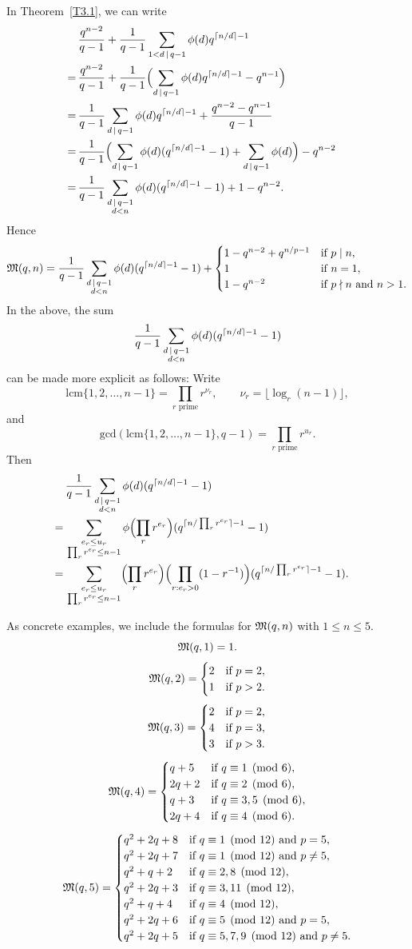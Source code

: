 \documentclass{amsart}
\numberwithin{equation}{section}
\theoremstyle{definition}
\begin{document}
In Theorem~\ref{T3.1}, we can write 
\begin{align*}
&\frac{q^{n-2}}{q-1}+\frac 1{q-1}\sum_{1<d\,\mid\, q-1}\phi(d)q^{\lceil n/d\rceil-1}\cr
=\,&\frac{q^{n-2}}{q-1}+\frac 1{q-1}\Bigl(\sum_{d\,\mid\, q-1}\phi(d)q^{\lceil n/d\rceil-1}-q^{n-1}\Bigr)\cr
=\,&\frac 1{q-1}\sum_{d\,\mid\, q-1}\phi(d)q^{\lceil n/d\rceil-1}+\frac{q^{n-2}-q^{n-1}}{q-1}\cr
=\,&\frac 1{q-1}\Bigl(\sum_{d\,\mid\, q-1}\phi(d)(q^{\lceil n/d\rceil-1}-1)+\sum_{d\,\mid\, q-1}\phi(d)\Bigr)-q^{n-2}\cr
=\,&\frac 1{q-1}\sum_{\substack{d\,\mid\, q-1\cr d<n}}\phi(d)(q^{\lceil n/d\rceil-1}-1)+1-q^{n-2}.
\end{align*}
Hence
\[
\frak M(q,n)=\frac 1{q-1}\sum_{\substack{d\,\mid\, q-1\cr d<n}}\phi(d)(q^{\lceil n/d\rceil-1}-1)+\begin{cases}
1-q^{n-2}+q^{n/p-1}&\text{if}\ p\mid n,\cr
1&\text{if}\ n=1,\cr
1-q^{n-2}&\text{if $p\nmid n$ and $n>1$}.
\end{cases}
\]
In the above, the sum
\[
\frac 1{q-1}\sum_{\substack{d\,\mid\, q-1\cr d<n}}\phi(d)(q^{\lceil n/d\rceil-1}-1)
\]
can be made more explicit as follows: Write
\[
\text{lcm}\{1,2,\dots,n-1\}=\prod_{\text{$r$ prime}}r^{\nu_r},\qquad \nu_r=\lfloor\log_r(n-1)\rfloor,
\]
and
\[
\text{gcd}(\text{lcm}\{1,2,\dots,n-1\},q-1)=\prod_{\text{$r$ prime}}r^{u_r}. 
\]
Then
\begin{align*}
&\frac 1{q-1}\sum_{\substack{d\,\mid\, q-1\cr d<n}}\phi(d)(q^{\lceil n/d\rceil-1}-1)\cr
=\,&\sum_{\substack{e_r\le u_r\cr \prod_r r^{e_r}\le n-1}}\phi\Bigl(\prod_r r^{e_r}\Bigr)(q^{\lceil n/\prod_r r^{e_r}\rceil-1}-1)\cr
=\,&\sum_{\substack{e_r\le u_r\cr \prod_r r^{e_r}\le n-1}}\Bigl(\prod_r r^{e_r}\Bigr)\Bigl(\prod_{r: e_r>0}(1-r^{-1})\Bigr)(q^{\lceil n/\prod_r r^{e_r}\rceil-1}-1).
\end{align*}

As concrete examples, we include the formulas for $\frak M(q,n)$ with $1\le n\le 5$.
\[
\frak M(q,1)=1.
\]
\[
\frak M(q,2)=\begin{cases}
2&\text{if}\ p=2,\cr
1&\text{if}\ p>2.
\end{cases}
\]
\[
\frak M(q,3)=\begin{cases}
2&\text{if}\ p=2,\cr
4&\text{if}\ p=3,\cr
3&\text{if}\ p>3.
\end{cases}
\]
\[
\frak M(q,4)=\begin{cases}
q+5&\text{if}\ q\equiv 1\pmod 6,\cr
2q+2&\text{if}\ q\equiv 2\pmod 6,\cr
q+3&\text{if}\ q\equiv 3,5\pmod 6,\cr
2q+4&\text{if}\ q\equiv 4\pmod 6.
\end{cases}
\]
\[
\frak M(q,5)=\begin{cases}
q^2+2q+8&\text{if}\ q\equiv 1\pmod{12}\ \text{and}\ p=5,\cr
q^2+2q+7&\text{if}\ q\equiv 1\pmod{12}\ \text{and}\ p\ne 5,\cr
q^2+q+2&\text{if}\ q\equiv 2,8\pmod{12},\cr
q^2+2q+3&\text{if}\ q\equiv 3,11\pmod{12},\cr
q^2+q+4&\text{if}\ q\equiv 4\pmod{12},\cr
q^2+2q+6&\text{if}\ q\equiv 5\pmod{12}\ \text{and}\ p=5,\cr
q^2+2q+5&\text{if}\ q\equiv 5,7,9\pmod{12}\ \text{and}\ p\ne 5.
\end{cases}
\]
\end{document}
